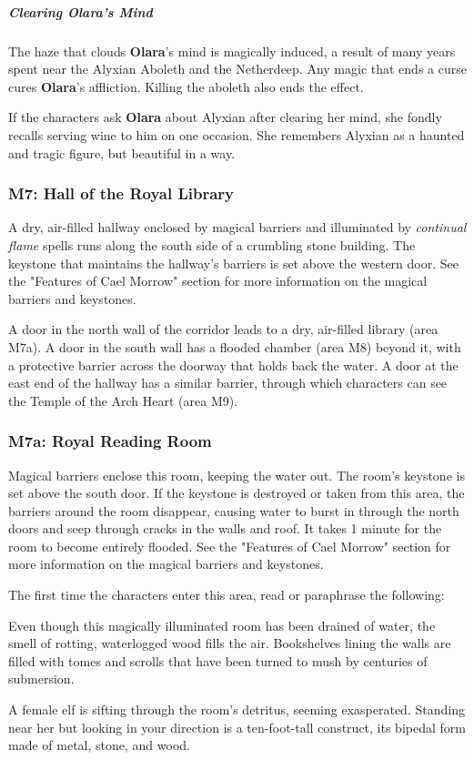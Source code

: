 \documentclass[10pt,a4paper,twoside,bg=print,twocolumn,openany,nodeprecatedcode]{dndbook}
\begin{document}
\subparagraph{Clearing Olara's Mind}
The haze that clouds \textbf{Olara}'s mind is magically induced, a result of many years spent near the Alyxian Aboleth and the Netherdeep. Any magic that ends a curse cures \textbf{Olara}'s affliction. Killing the aboleth also ends the effect.

If the characters ask \textbf{Olara} about Alyxian after clearing her mind, she fondly recalls serving wine to him on one occasion. She remembers Alyxian as a haunted and tragic figure, but beautiful in a way.

\subsubsection{M7: Hall of the Royal Library}
A dry, air-filled hallway enclosed by magical barriers and illuminated by \textit{continual flame} spells runs along the south side of a crumbling stone building. The keystone that maintains the hallway's barriers is set above the western door. See the "Features of Cael Morrow" section for more information on the magical barriers and keystones.

A door in the north wall of the corridor leads to a dry, air-filled library (area M7a). A door in the south wall has a flooded chamber (area M8) beyond it, with a protective barrier across the doorway that holds back the water. A door at the east end of the hallway has a similar barrier, through which characters can see the Temple of the Arch Heart (area M9).

\subsubsection{M7a: Royal Reading Room}
Magical barriers enclose this room, keeping the water out. The room's keystone is set above the south door. If the keystone is destroyed or taken from this area, the barriers around the room disappear, causing water to burst in through the north doors and seep through cracks in the walls and roof. It takes 1 minute for the room to become entirely flooded. See the "Features of Cael Morrow" section for more information on the magical barriers and keystones.

The first time the characters enter this area, read or paraphrase the following:

\begin{DndReadAloud}{}
Even though this magically illuminated room has been drained of water, the smell of rotting, waterlogged wood fills the air. Bookshelves lining the walls are filled with tomes and scrolls that have been turned to mush by centuries of submersion.

A female elf is sifting through the room's detritus, seeming exasperated. Standing near her but looking in your direction is a ten-foot-tall construct, its bipedal form made of metal, stone, and wood.

\end{DndReadAloud}
\end{document}
